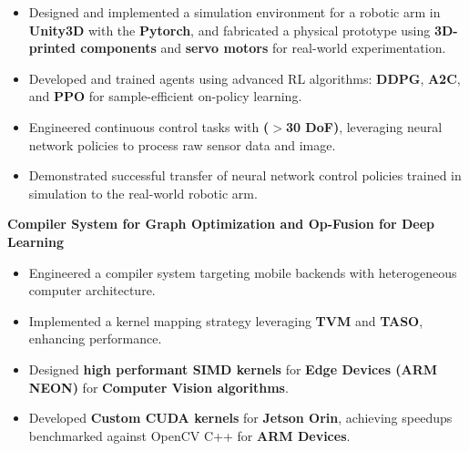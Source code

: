 \documentclass[10pt,a4]{article}
\begin{document}
{\begin{flushleft}
        \vspace{0.25mm}
        \begin{itemize}
            \item Designed and implemented a simulation environment for a robotic arm in \textbf{Unity3D} with the \textbf{Pytorch}, and fabricated a physical prototype using \textbf{3D-printed components} and \textbf{servo motors} for real-world experimentation.
            \item Developed and trained agents using advanced RL algorithms: \textbf{DDPG}, \textbf{A2C}, and \textbf{PPO} for sample-efficient on-policy learning.
            \item Engineered continuous control tasks with \textbf{($>$30 DoF)}, leveraging neural network policies to process raw sensor data and image.
            \item Demonstrated successful transfer of neural network control policies trained in simulation to the real-world robotic arm.
        \end{itemize}
        \item \hspace{1.5mm} \textbf{\large Compiler System for Graph Optimization and Op-Fusion for Deep Learning}
        \vspace{0.25mm}
        \begin{itemize}
            \item Engineered a compiler system targeting mobile backends with heterogeneous computer architecture.
            \item Implemented a kernel mapping strategy leveraging \textbf{TVM} and \textbf{TASO}, enhancing performance.
            \item Designed \textbf{high performant SIMD kernels} for \textbf{Edge Devices (ARM NEON)} for \textbf{Computer Vision algorithms}.
            \item Developed \textbf{Custom CUDA kernels} for \textbf{Jetson Orin}, achieving speedups benchmarked against OpenCV C++ for \textbf{ARM Devices}.
        \end{itemize}


\end{flushleft}


}
	
\end{document}
